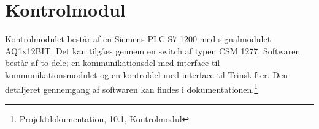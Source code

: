 
\section{Kontrolmodul}

Kontrolmodulet består af en Siemens PLC S7-1200 med signalmodulet AQ1x12BIT. Det kan tilgåes gennem en switch af typen CSM 1277.
Softwaren består af to dele; en kommunikationsdel med interface til kommunikationsmodulet og en kontroldel med interface til Trinskifter. Den detaljeret gennemgang af softwaren kan findes i dokumentationen.\footnote{Projektdokumentation, 10.1, Kontrolmodul}